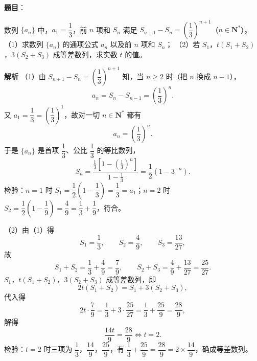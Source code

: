 \begin{answer}

\textbf{题目}：

数列 $\{a_n\}$ 中，$a_1=\dfrac13$，前 $n$ 项和 $S_n$ 满足 $S_{n+1}-S_n=\left(\dfrac13\right)^{n+1}$（$n\in\mathbf N^*$）。
（1）求数列 $\{a_n\}$ 的通项公式 $a_n$ 以及前 $n$ 项和 $S_n$；
（2）若 $S_1$，$t(S_1+S_2)$，$3(S_2+S_3)$ 成等差数列，求实数 $t$ 的值。

\textbf{解析}
（1）由 $S_{n+1}-S_n=\left(\dfrac13\right)^{n+1}$ 知，当 $n\geqslant2$ 时（把 $n$ 换成 $n-1$），
\nopagebreak[4]
\[a_n=S_n-S_{n-1}=\left(\frac13\right)^{n}.\]
又 $a_1=\dfrac13=\left(\dfrac13\right)^1$，故对一切 $n\in\mathbf N^*$ 都有
\nopagebreak[4]
\[a_n=\left(\frac13\right)^n.\]
于是 $\{a_n\}$ 是首项 $\dfrac13$、公比 $\dfrac13$ 的等比数列，
\nopagebreak[4]
\[S_n=\frac{\frac13\left[1-\left(\frac13\right)^n\right]}{1-\frac13}
=\frac12\left(1-3^{-n}\right).\]
检验：$n=1$ 时 $S_1=\dfrac12\left(1-\dfrac13\right)=\dfrac13=a_1$；$n=2$ 时 $S_2=\dfrac12\left(1-\dfrac19\right)=\dfrac49=\dfrac13+\dfrac19$，符合。

（2）由（1）得
\nopagebreak[4]
\[S_1=\frac13,\qquad S_2=\frac49,\qquad S_3=\frac{13}{27},\]
故
\nopagebreak[4]
\[S_1+S_2=\frac13+\frac49=\frac79,\qquad S_2+S_3=\frac49+\frac{13}{27}=\frac{25}{27}.\]
$S_1$，$t(S_1+S_2)$，$3(S_2+S_3)$ 成等差数列，即
\nopagebreak[4]
\[2t(S_1+S_2)=S_1+3(S_2+S_3),\]
代入得
\nopagebreak[4]
\[2t\cdot\frac79=\frac13+3\cdot\frac{25}{27}=\frac13+\frac{25}{9}=\frac{28}{9},\]
解得
\nopagebreak[4]
\[\frac{14t}{9}=\frac{28}{9}\iff t=2.\]
检验：$t=2$ 时三项为 $\dfrac13$，$\dfrac{14}{9}$，$\dfrac{25}{9}$，有 $\dfrac13+\dfrac{25}{9}=\dfrac{28}{9}=2\times\dfrac{14}{9}$，确成等差数列。


\end{answer}
